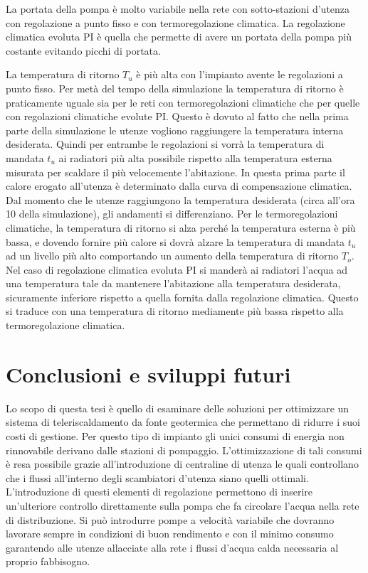 \documentclass[laurea,oneside,11pt]{USiena_tesiLM}
\begin{document}
La portata della pompa è molto variabile nella rete con sotto-stazioni d'utenza con regolazione a punto fisso e con termoregolazione climatica. La regolazione climatica evoluta PI è quella che permette di avere un portata della pompa più costante evitando picchi di portata.

La temperatura di ritorno $T_u$  è più alta con l'impianto avente le regolazioni a punto fisso. Per metà del tempo della simulazione la temperatura di ritorno è praticamente uguale sia per le reti con termoregolazioni climatiche che per quelle con regolazioni climatiche evolute PI. Questo è dovuto al fatto che nella prima parte della simulazione le utenze vogliono raggiungere la temperatura interna desiderata. Quindi per entrambe le regolazioni si vorrà la temperatura di mandata $t_u$ ai radiatori più alta possibile rispetto alla temperatura esterna misurata per scaldare il più velocemente l'abitazione. In questa prima parte il calore erogato all'utenza è determinato dalla curva di compensazione climatica. Dal momento che le utenze raggiungono la temperatura desiderata (circa all'ora 10 della simulazione), gli andamenti si differenziano. Per le termoregolazioni climatiche, la temperatura di ritorno si alza perché la  temperatura esterna è più bassa, e dovendo fornire più calore  si dovrà alzare la temperatura di mandata $t_u$ ad un livello più alto comportando un aumento della temperatura di ritorno $T_o$. Nel caso di regolazione climatica evoluta PI si manderà ai radiatori l'acqua ad una temperatura tale da mantenere l'abitazione alla temperatura desiderata, sicuramente inferiore rispetto a quella fornita dalla regolazione climatica. Questo si traduce con una temperatura di ritorno mediamente più bassa rispetto alla termoregolazione climatica.

\chapter{Conclusioni e sviluppi futuri}

Lo scopo di questa tesi è quello di esaminare delle soluzioni per ottimizzare un sistema di teleriscaldamento da fonte geotermica che permettano di ridurre i suoi costi di gestione. Per questo tipo di impianto gli unici consumi di energia non rinnovabile derivano dalle stazioni di pompaggio. L'ottimizzazione di tali consumi è resa possibile grazie all'introduzione di centraline di utenza le quali controllano che i flussi all'interno degli scambiatori d'utenza siano quelli ottimali. L'introduzione di questi elementi di regolazione permettono di inserire un'ulteriore controllo direttamente sulla pompa che fa circolare l'acqua nella rete di distribuzione. Si può introdurre pompe a velocità variabile  che dovranno lavorare sempre in condizioni di buon rendimento e con il minimo consumo garantendo alle utenze allacciate alla rete i flussi d'acqua calda necessaria al proprio fabbisogno. 
\end{document}
